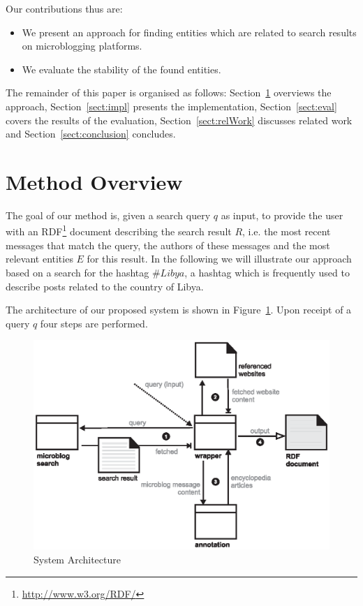 \documentclass{llncs}
\begin{document}
Our contributions thus are:
\begin{itemize}
	\item We present an approach for finding entities which are related to search results on microblogging platforms.
	\item We evaluate the stability of the found entities.
\end{itemize}

The remainder of this paper is organised as follows: Section~\ref{sect:method} overviews the approach,
Section~\ref{sect:impl} presents the implementation,
Section~\ref{sect:eval} covers the results of the evaluation,
Section~\ref{sect:relWork} discusses related work and  Section~\ref{sect:conclusion} concludes.

\section{Method Overview}
\label{sect:method}

The goal of our method is, given a search query $q$ as input, to provide the user with an RDF\footnote{\url{http://www.w3.org/RDF/}} document describing the search result $R$, i.e. the most recent messages that match the query, the authors of these messages and the most relevant entities $E$ for this result. 
In the following we will illustrate our approach based on a search for the hashtag $\#Libya$, a hashtag
which is frequently used to describe posts related to the country of Libya.

The architecture of our proposed system is shown in Figure~\ref{fig:arch}. Upon
receipt of a query $q$ four steps are performed. 

\begin{figure}[htb]
  \centering
  \includegraphics[width=.7\linewidth]{architecture}
  \caption{System Architecture}
  \label{fig:arch}
\end{figure}
\end{document}
